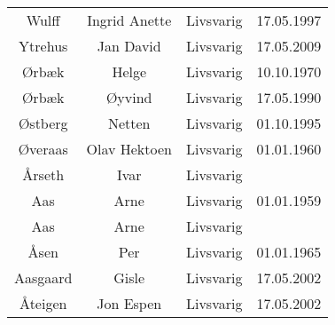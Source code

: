 \begin{tabular}{cccc}
        Wulff 	&	Ingrid Anette	&	Livsvarig	&	17.05.1997	\\
        Ytrehus	&	Jan David	&	Livsvarig	&	17.05.2009	\\
        Ørbæk	&	Helge	&	Livsvarig 	&	10.10.1970	\\
        Ørbæk	&	Øyvind	&	Livsvarig 	&	17.05.1990	\\
        Østberg 	&	Netten	&	Livsvarig	&	01.10.1995	\\
        Øveraas	&	Olav Hektoen	&	Livsvarig 	&	01.01.1960	\\
        Årseth	&	Ivar	&	Livsvarig 	&		\\
        Aas	&	Arne	&	Livsvarig 	&	01.01.1959	\\
        Aas	&	Arne	&	Livsvarig 	&		\\
        Åsen	&	Per	&	Livsvarig 	&	01.01.1965	\\
        Aasgaard 	&	Gisle	&	Livsvarig	&	17.05.2002	\\
        Åteigen 	&	Jon Espen	&	Livsvarig	&	17.05.2002
    \end{tabular}
